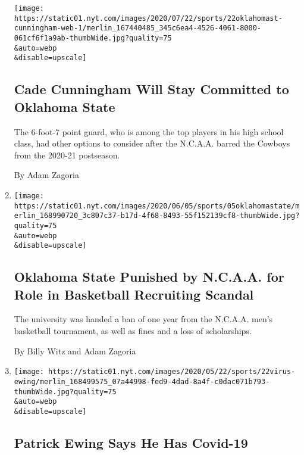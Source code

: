 \begin{enumerate}
  \texttt{[image: https://static01.nyt.com/images/2020/07/22/sports/22oklahomast-cunningham-web-1/merlin\_167440485\_345c6ea4-4526-4061-8000-061cf6f1a9ab-thumbWide.jpg?quality=75\\\&auto=webp\\\&disable=upscale]}

  \hypertarget{cade-cunningham-will-stay-committed-to-oklahoma-state}{%
  \subsection{Cade Cunningham Will Stay Committed to Oklahoma
  State}\label{cade-cunningham-will-stay-committed-to-oklahoma-state}}

  The 6-foot-7 point guard, who is among the top players in his high
  school class, had other options to consider after the N.C.A.A. barred
  the Cowboys from the 2020-21 postseason.

  By Adam Zagoria
\item
  \href{/2020/06/05/sports/ncaabasketball/oklahoma-state-ncaa-punishment.html}{}

  \texttt{[image: https://static01.nyt.com/images/2020/06/05/sports/05oklahomastate/merlin\_168990720\_3c807c37-b17d-4f68-8493-55f152139cf8-thumbWide.jpg?quality=75\\\&auto=webp\\\&disable=upscale]}

  \hypertarget{oklahoma-state-punished-by-ncaa-for-role-in-basketball-recruiting-scandal}{%
  \subsection{Oklahoma State Punished by N.C.A.A. for Role in Basketball
  Recruiting
  Scandal}\label{oklahoma-state-punished-by-ncaa-for-role-in-basketball-recruiting-scandal}}

  The university was handed a ban of one year from the N.C.A.A. men's
  basketball tournament, as well as fines and a loss of scholarships.

  By Billy Witz and Adam Zagoria
\item
  \href{/2020/05/22/sports/basketball/patrick-ewing-coronavirus.html}{}

  \texttt{[image: https://static01.nyt.com/images/2020/05/22/sports/22virus-ewing/merlin\_168499575\_07a44998-fed9-4dad-8a4f-c0dac071b793-thumbWide.jpg?quality=75\\\&auto=webp\\\&disable=upscale]}

  \hypertarget{patrick-ewing-says-he-has-covid-19}{%
  \subsection{Patrick Ewing Says He Has
  Covid-19}\label{patrick-ewing-says-he-has-covid-19}}


\end{enumerate}
